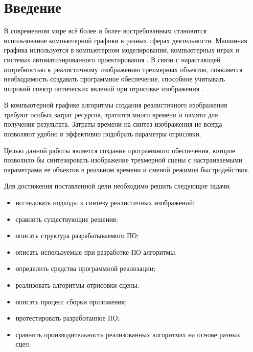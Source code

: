 \chapter*{Введение}

В современном мире всё более и более востребованным становится использование компьютерной графики в разных сферах деятельности. Машинная графика используется в компьютерном моделировании, компьютерных играх и системах автоматизированного проектирования \cite{cad}. В связи с нарастающей потребностью к реалистичному изображению трехмерных объектов, появляется необходимость создавать программное обеспечение, способное учитывать широкий спектр оптических явлений при отрисовке изображения \cite{optics}.

В компьютерной графике алгоритмы создания реалистичного изображения требуют особых затрат ресурсов, тратится много времени и памяти для получения результата. Затраты времени на синтез изображения не всегда позволяют удобно и эффективно подобрать параметры отрисовки.

Целью данной работы является создание программного обеспечения, которое позволило бы синтезировать изображение трехмерной сцены с настраиваемыми параметрами ее объектов в реальном времени и сменой режимов быстродействия.

Для достижения поставленной цели необходимо решить следующие задачи:

\begin{itemize}
    \item исследовать подходы к синтезу реалистичных изображений;
    \item сравнить существующие решения;
    \item описать структура разрабатываемого ПО;
    \item описать используемые при разработке ПО алгоритмы;
    \item определить средства программной реализации;
    \item реализовать алгоритмы отрисовки сцены;
    \item описать процесс сборки приложения;
    \item протестировать разработанное ПО;
    \item сравнить производительность реализованных алгоритмах на основе разных сцен.
\end{itemize}